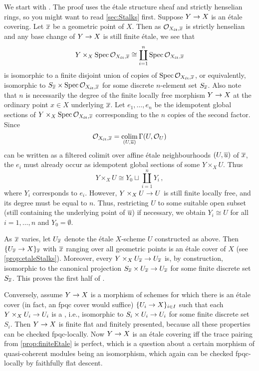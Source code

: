 \begin{proof*}
	We start with . The proof uses the étale structure sheaf and strictly henselian rings, so you might want to read \cref{sec:Stalks} first. Suppose $Y\morphism X$ is an étale covering. Let $\ov{x}$ be a geometric point of $X$. Then as $\Oo_{X_\et,\ov{x}}$ is strictly henselian and any base change of $Y\morphism X$ is still finite étale, we see that
	\begin{equation*}
		Y\times_X\Spec \Oo_{X_\et,\ov{x}}\cong \coprod_{i=1}^n\Spec \Oo_{X_\et,\ov{x}}
	\end{equation*}
	is isomorphic to a finite disjoint union of copies of $\Spec \Oo_{X_\et,\ov{x}}$, or equivalently, isomorphic to $S_{\ov{x}}\times \Spec \Oo_{X_\et,\ov{x}}$ for some discrete $n$-element set $S_{\ov{x}}$. Also note that $n$ is necessarily the degree of the finite locally free morphism $Y\morphism X$ at the ordinary point $x\in X$ underlying $\ov{x}$. Let $e_1,\ldots,e_n$ be the idempotent global sections of $Y\times_X\Spec\Oo_{X_\et,\ov{x}}$ corresponding to the $n$ copies of the second factor. Since 
	\begin{equation*}
		\Oo_{X_\et,\ov{x}}=\colimit_{(U,\ov{u})}\Global(U,\Oo_U)
	\end{equation*}
	can be written as a filtered colimit over affine étale neighbourhoods $(U,\ov{u})$ of $\ov{x}$, the $e_i$ must already occur as idempotent global sections of some $Y\times_XU$. Thus
	\begin{equation*}
		Y\times_XU\cong Y_0\sqcup\coprod_{i=1}^nY_i\,,
	\end{equation*}
	where $Y_i$ corresponds to $e_i$. However, $Y\times_XU\morphism U$ is still finite locally free, and its degree must be equal to $n$. Thus, restricting $U$ to some suitable open subset (still containing the underlying point of $\ov{u}$) if necessary, we obtain $Y_i\cong U$ for all $i=1,\dotsc,n$ and $Y_0=\emptyset$.
	
	As $\ov{x}$ varies, let $U_{\ov{x}}$ denote the étale $X$-scheme $U$ constructed as above. Then $\{U_{\ov{x}}\morphism X\}_{\ov{x}}$ with $\ov{x}$ ranging over all geometric points is an étale cover of $X$ (see \cref{prop:etaleStalks}). Moreover, every $Y\times_XU_{\ov{x}}\morphism U_{\ov{x}}$ is, by construction, isomorphic to the canonical projection $S_{\ov{x}}\times U_{\ov{x}}\morphism U_{\ov{x}}$ for some finite discrete set $S_{\ov{x}}$. This proves the first half of .
	
	Conversely, assume $Y\morphism X$ is a morphism of schemes for which there is an étale cover (in fact, an fpqc cover would suffice) $\{U_i\morphism X\}_{i\in I}$ such that each $Y\times_XU_i\morphism U_i$ is a , i.e., isomorphic to $S_i\times U_i\morphism U_i$ for some finite discrete set $S_i$. Then $Y\morphism X$ is finite flat and finitely presented, because all these properties can be checked fpqc-locally. Now $Y\morphism X$ is an étale covering iff the trace pairing from \cref{prop:finiteEtale} is perfect, which is a question about a certain morphism of quasi-coherent modules being an isomorphism, which again can be checked fpqc-locally by faithfully flat descent.
	

\end{proof*}
